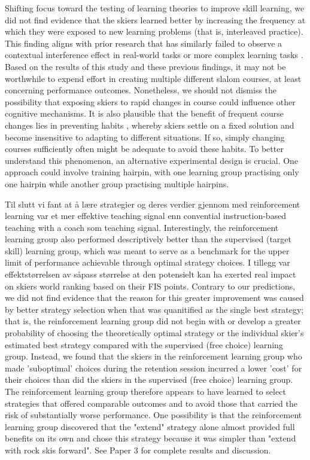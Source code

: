 Shifting focus toward the testing of learning theories to improve skill learning, we did not find evidence that the skiers learned better by increasing the frequency at which they were exposed to new learning problems (that is, interleaved practice). This finding aligns with prior research that has similarly failed to observe a contextual interference effect in real-world tasks or more complex learning tasks \cite{brady_theoretical_1998, barreiros_contextual_2007, wulf_principles_2002}. Based on the results of this study and these previous findings, it may not be worthwhile to expend effort in creating multiple different slalom courses, at least concerning performance outcomes. Nonetheless, we should not dismiss the possibility that exposing skiers to rapid changes in course could influence other cognitive mechanisms. It is also plausible that the benefit of frequent course changes lies in preventing habits \cite{du_relationship_2022}, whereby skiers settle on a fixed solution and become insensitive to adapting to different situations. If so, simply changing courses sufficiently often might be adequate to avoid these habits. To better understand this phenomenon, an alternative experimental design is crucial. One approach could involve training hairpin, with one learning group practising only one hairpin while another group practising multiple hairpins.

Til slutt vi fant at å lære strategier og deres verdier gjennom med reinforcement learning var et mer effektive teaching signal enn convential instruction-based teaching with a coach som teaching signal.  Interestingly, the reinforcement learning group also performed descriptively better than the supervised (target skill) learning group, which was meant to serve as a benchmark for the upper limit of performance achievable through optimal strategy choices. I tillegg var effektstørrelsen av såpass størrelse at den potensielt kan ha exerted real impact on skiers world ranking based on their FIS points. Contrary to our predictions, we did not find evidence that the reason for this greater improvement was caused by better strategy selection when that was quanitified as the single best strategy; that is, the reinforcement learning group did not begin with or develop a greater probability of choosing the theoretically optimal strategy or the individual skier's estimated best strategy compared with the supervised (free choice) learning group. Instead, we found that the skiers in the reinforcement learning group who made 'suboptimal' choices during the retention session incurred a lower 'cost' for their choices than did the skiers in the supervised (free choice) learning group. The reinforcement learning group therefore appears to have learned to select strategies that offered comparable outcomes and to avoid those that carried the risk of substantially worse performance. One possibility is that the reinforcement learning group discovered that the "extend" strategy alone almost provided full benefits on its own and chose this strategy because it was simpler than "extend with rock skis forward". See Paper 3 for complete results and discussion.

